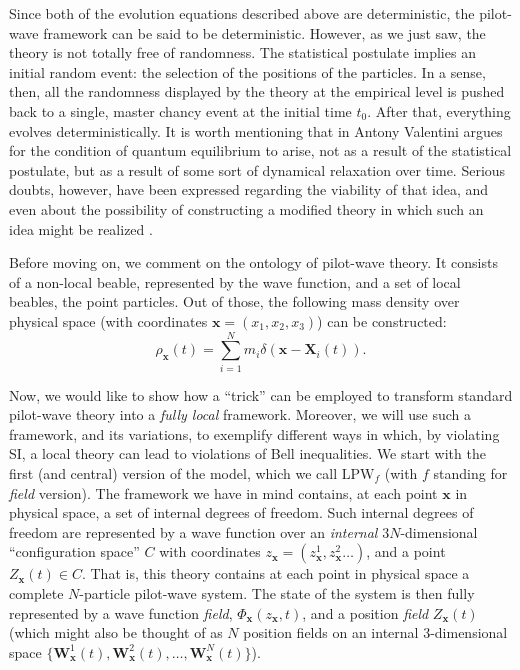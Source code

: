 \documentclass[letterpaper,12pt]{article}
\begin{document}
Since both of the evolution equations described above are deterministic, the pilot-wave framework can be said to be deterministic. However, as we just saw, the theory is not totally free of randomness. The statistical postulate implies an initial random event: the selection of the positions of the particles. In a sense, then, all the randomness displayed by the theory at the empirical level is pushed back to a single, master chancy event at the initial time $t_0$. After that, everything evolves deterministically. It is worth mentioning that in \cite{Valentini} Antony Valentini argues for the condition of quantum equilibrium to arise, not as a result of the statistical postulate, but as a result of some sort of dynamical relaxation over time. Serious doubts, however, have been expressed regarding the viability of that idea, and even about the possibility of constructing a modified theory in which such an idea might be realized \cite{ward}.
 
Before moving on, we comment on the ontology of pilot-wave theory. It consists of a non-local beable, represented by the wave function, and a set of local beables, the point particles. Out of those, the following mass density over physical space (with coordinates $\mathbf{x}=(x_1,x_2,x_3)$) can be constructed:
\begin{equation}
\rho_\mathbf{x}(t) = \sum_{i=1}^N m_i \delta (\mathbf{x}-\mathbf{X}_i(t)).
 \end{equation}
 
Now, we would like to show how a ``trick'' can be employed to transform standard pilot-wave theory into a \emph{fully local} framework. Moreover, we will use such a framework, and its variations, to exemplify different ways in which, by violating SI, a local theory can lead to violations of Bell inequalities. We start with the first (and central) version of the model, which we call $\text{LPW}_f$ (with $f$ standing for \emph{field} version). The framework we have in mind contains, at each point $\mathbf{x}$ in physical space, a set of internal degrees of freedom. Such internal degrees of freedom are represented by a wave function over an \emph{internal} $3N$-dimensional ``configuration space'' $C$ with coordinates $z_{\mathbf{x}}=(z^1_\mathbf{x},z^2_\mathbf{x}\ldots)$, and a point $Z_{\mathbf{x}}(t) \in C$. That is, this theory contains at each point in physical space a complete $N$-particle pilot-wave system. The state of the system is then fully represented by a wave function \emph{field}, $\Phi_\mathbf{x}(z_\mathbf{x},t)$, and a position \emph{field} $Z_\mathbf{x}(t)$ (which might also be thought of as $N$ position fields on an internal 3-dimensional space $\{\mathbf{W}_\mathbf{x}^1 (t),\mathbf{W}_\mathbf{x}^2 (t),\dots,\mathbf{W}_\mathbf{x}^N (t)\}$).%
\end{document}
